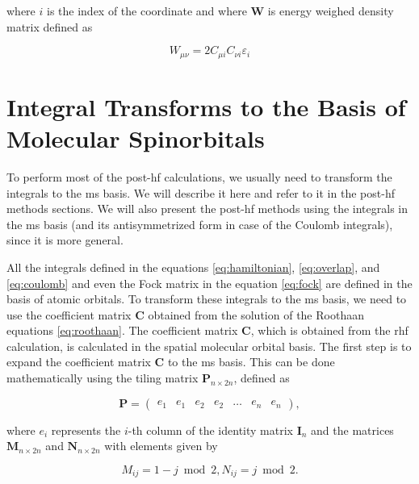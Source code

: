 where \(i\) is the index of the coordinate and where \(\mathbf{W}\) is energy weighed density matrix defined as

\begin{equation}
W_{\mu\nu}=2C_{\mu i}C_{\nu i}\varepsilon_i
\end{equation}

\section{\texorpdfstring{Integral Transforms to the Basis of Molecular Spinorbitals\label{sec:integral_transform}}{Integral Transforms to the Basis of Molecular Spinorbitals}}

To perform most of the \acrfull{post-hf} calculations, we usually need to transform the integrals to the \acrshort{ms} basis. We will describe it here and refer to it in the \acrshort{post-hf} methods sections. We will also present the \acrshort{post-hf} methods using the integrals in the \acrshort{ms} basis (and its antisymmetrized form in case of the Coulomb integrals), since it is more general.

All the integrals defined in the equations \ref{eq:hamiltonian}, \ref{eq:overlap}, and \ref{eq:coulomb} and even the Fock matrix in the equation \ref{eq:fock} are defined in the basis of atomic orbitals. To transform these integrals to the \acrshort{ms} basis, we need to use the coefficient matrix \(\mathbf{C}\) obtained from the solution of the Roothaan equations \ref{eq:roothaan}. The coefficient matrix \(\mathbf{C}\), which is obtained from the \acrshort{rhf} calculation, is calculated in the spatial molecular orbital basis. The first step is to expand the coefficient matrix \(\mathbf{C}\) to the \acrshort{ms} basis. This can be done mathematically using the tiling matrix \(\mathbf{P}_{n\times 2n}\), defined as

\begin{equation}
\mathbf{P}=
\begin{pmatrix}
e_1&e_1&e_2&e_2&\dots&e_n&e_n
\end{pmatrix}
,
\end{equation}

where \(e_i\) represents the \(i\)-th column of the identity matrix \(\mathbf{I}_n\) and the matrices \(\mathbf{M}_{n\times 2n}\) and \(\mathbf{N}_{n\times 2n}\) with elements given by

\begin{equation}
M_{ij}=1-j\bmod 2,N_{ij}=j \bmod 2.
\end{equation}

